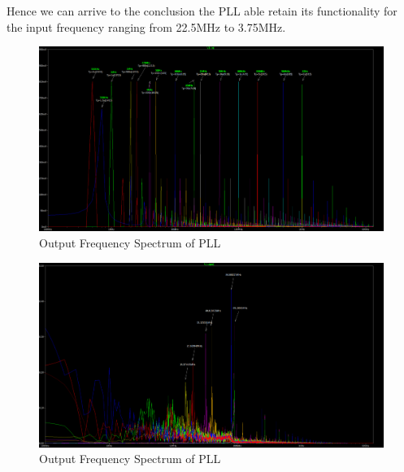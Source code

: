 Hence we can arrive to the conclusion the PLL able retain its functionality for the input frequency ranging from 22.5MHz to 3.75MHz.
\begin{figure}
    \centering
    \includegraphics[width=1\linewidth]{figs/finfft.png}
    \caption{Output Frequency Spectrum of PLL}
    \label{fig:batch_input_frequency_spectrum}
    \vspace{0.5cm}

\end{figure}
\begin{figure}
    \centering
    \includegraphics[width=1\linewidth]{figs/foutfft.png}
    \caption{Output Frequency Spectrum of PLL}
    \label{fig:batch_output_frequency_spectrum}
    \vspace{0.5cm}
\end{figure}